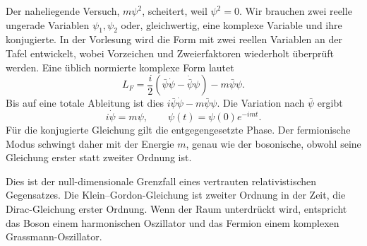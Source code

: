 Der naheliegende Versuch, \(m\psi^2\), scheitert, weil \(\psi^2=0\). Wir brauchen zwei reelle ungerade Variablen \(\psi_1,\psi_2\) oder, gleichwertig, eine komplexe Variable und ihre konjugierte. In der Vorlesung wird die Form mit zwei reellen Variablen an der Tafel entwickelt, wobei Vorzeichen und Zweierfaktoren wiederholt überprüft werden. Eine üblich normierte komplexe Form lautet
\begin{equation}
L_F=\frac{i}{2}
\left(\bar\psi\dot\psi-\dot{\bar\psi}\psi\right)
-m\bar\psi\psi.
\label{eq:l7-fermion-lagrangian}
\end{equation}
Bis auf eine totale Ableitung ist dies \(i\bar\psi\dot\psi-m\bar\psi\psi\). Die Variation nach \(\bar\psi\) ergibt
\begin{equation}
i\dot\psi=m\psi,
\qquad
\psi(t)=\psi(0)e^{-imt}.
\label{eq:l7-fermion-eom}
\end{equation}
Für die konjugierte Gleichung gilt die entgegengesetzte Phase. Der fermionische Modus schwingt daher mit der Energie \(m\), genau wie der bosonische, obwohl seine Gleichung erster statt zweiter Ordnung ist.


Dies ist der null-dimensionale Grenzfall eines vertrauten relativistischen Gegensatzes. Die Klein--Gordon-Gleichung ist zweiter Ordnung in der Zeit, die Dirac-Gleichung erster Ordnung. Wenn der Raum unterdrückt wird, entspricht das Boson einem harmonischen Oszillator und das Fermion einem komplexen Grassmann-Oszillator.

\begin{classroomqa}
\end{classroomqa}

